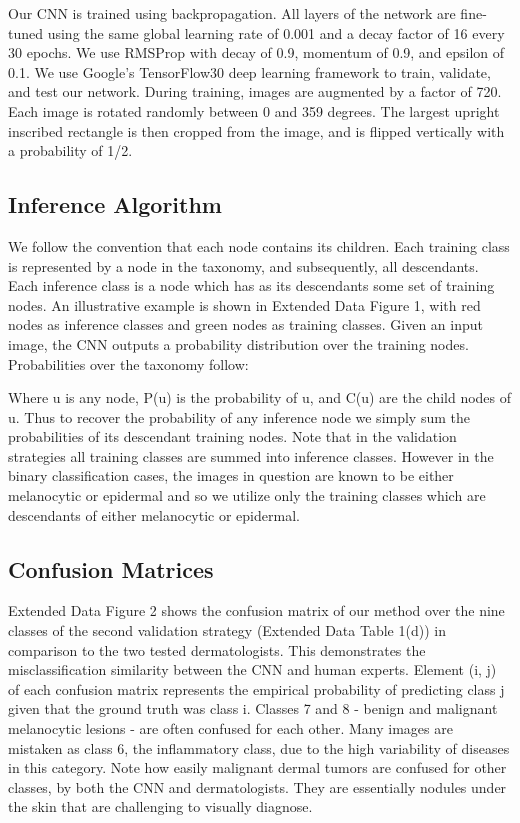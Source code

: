 Our CNN is trained using backpropagation. All layers of the network are fine-tuned using the same global learning rate of 0.001 and a decay factor of 16 every 30 epochs. We use RMSProp with decay of 0.9, momentum of 0.9, and epsilon of 0.1. We use Google’s TensorFlow30 deep learning framework to train, validate, and test our network. During training, images are augmented by a factor of 720. Each image is rotated randomly between 0 and 359 degrees. The largest upright inscribed rectangle is then cropped from the image, and is flipped vertically with a probability of 1/2. 

\subsection{Inference Algorithm}
We follow the convention that each node contains its children. Each training class is represented by a node in the taxonomy, and subsequently, all descendants. Each inference class is a node which has as its descendants some set of training nodes. An illustrative example is shown in Extended Data Figure 1, with red nodes as inference classes and green nodes as training classes. Given an input image, the CNN outputs a probability distribution over the training nodes. Probabilities over the taxonomy follow:

Where u is any node, P(u) is the probability of u, and C(u) are the child nodes of u. Thus to recover the probability of any inference node we simply sum the probabilities of its descendant training nodes. Note that in the validation strategies all training classes are summed into inference classes. However in the binary classification cases, the images in question are known to be either melanocytic or epidermal and so we utilize only the training classes which are descendants of either melanocytic or epidermal.

\subsection{Confusion Matrices}
Extended Data Figure 2 shows the confusion matrix of our method over the nine classes of the second validation strategy (Extended Data Table 1(d)) in comparison to the two tested dermatologists. This demonstrates the misclassification similarity between the CNN and human experts. Element (i, j) of each confusion matrix represents the empirical probability of predicting class j given that the ground truth was class i. Classes 7 and 8 - benign and malignant melanocytic lesions - are often confused for each other. Many images are mistaken as class 6, the inflammatory class, due to the high variability of diseases in this category. Note how easily malignant dermal tumors are confused for other classes, by both the CNN and dermatologists. They are essentially nodules under the skin that are challenging to visually diagnose. 

